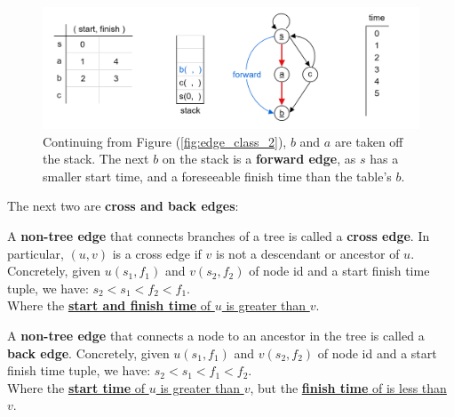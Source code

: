 \begin{figure}[h]
    \begin{center}
    \includegraphics[width=1\textwidth]{./Sections/graphs/edges/eg_3.png}
    \end{center}
     \caption{Continuing from Figure (\ref{fig:edge_class_2}), $b$ and $a$ are taken off the stack. The next $b$ on the stack is a \textbf{forward edge}, as $s$ has a 
     smaller start time, and a foreseeable finish time than the table's $b$.}
     \label{fig:edge_class_3}
  \end{figure}

\newpage 

\noindent
The next two are \textbf{cross and back edges}:

\begin{Def}

    A \textbf{non-tree edge} that connects branches of a tree is called a \textbf{cross edge}.
    In particular, $(u, v)$ is a cross edge if $v$ is not a descendant or ancestor of $u$.
    Concretely, given $u(s_1,f_1)$ and $v(s_2,f_2)$ of node id and a start finish time tuple, we have: $s_2 < s_1 < f_2 < f_1$.\\
    Where the \underline{\textbf{start and finish time} of $u$ is greater than $v$}.
\end{Def}

\begin{Def}

    A \textbf{non-tree edge} that connects a node to an ancestor in the tree is called a \textbf{back edge}.
    Concretely, given $u(s_1,f_1)$ and $v(s_2,f_2)$ of node id and a start finish time tuple, we have: $s_2 < s_1 < f_1 < f_2$.\\
    Where the \underline{\textbf{start time} of $u$ is greater than $v$}, but the \underline{\textbf{finish time} of is less than $v$}.
\end{Def}

